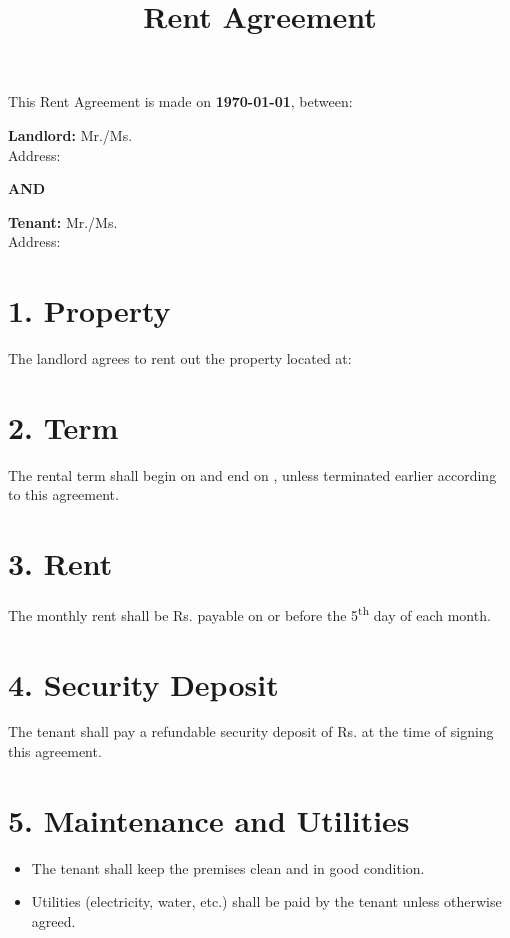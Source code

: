 \documentclass[12pt]{article}
\title{\textbf{Rent Agreement}}
\date{}
\begin{document}
\maketitle

This Rent Agreement is made on \textbf{\today}, between:

\textbf{Landlord:} Mr./Ms. \underline{\hspace{8cm}}\\
Address: \underline{\hspace{12cm}}

\textbf{AND}

\textbf{Tenant:} Mr./Ms. \underline{\hspace{8cm}}\\
Address: \underline{\hspace{12cm}}

\section*{1. Property}
The landlord agrees to rent out the property located at:\\
\underline{\hspace{16cm}}

\section*{2. Term}
The rental term shall begin on \underline{\hspace{5cm}} and end on \underline{\hspace{5cm}}, unless terminated earlier according to this agreement.

\section*{3. Rent}
The monthly rent shall be Rs. \underline{\hspace{3cm}} payable on or before the 5\textsuperscript{th} day of each month.

\section*{4. Security Deposit}
The tenant shall pay a refundable security deposit of Rs. \underline{\hspace{3cm}} at the time of signing this agreement.

\section*{5. Maintenance and Utilities}
\begin{itemize}[noitemsep]
    \item The tenant shall keep the premises clean and in good condition.
    \item Utilities (electricity, water, etc.) shall be paid by the tenant unless otherwise agreed.
\end{itemize}
\end{document}
